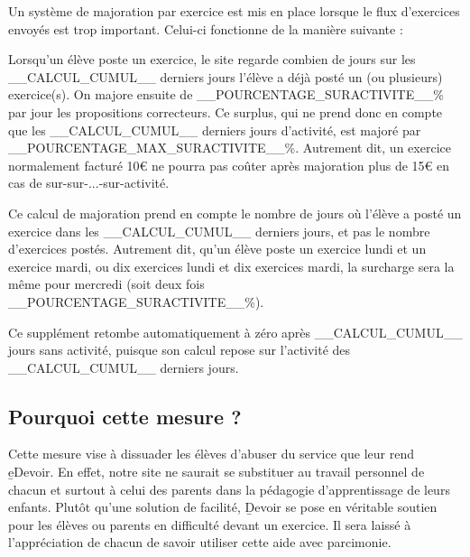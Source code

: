 ﻿Un système de majoration par exercice est mis en place lorsque le flux d'exercices envoyés est trop important. Celui-ci fonctionne de la manière suivante :
\item Lorsqu'un élève poste un exercice, le site regarde combien de jours sur les __CALCUL_CUMUL__ derniers jours l'élève a déjà posté un (ou plusieurs) exercice(s). On majore ensuite de __POURCENTAGE_SURACTIVITE__\% par jour les propositions correcteurs. Ce surplus, qui ne prend donc en compte que les __CALCUL_CUMUL__ derniers jours d'activité, est majoré par __POURCENTAGE_MAX_SURACTIVITE__\%. Autrement dit, un exercice normalement facturé 10€ ne pourra pas coûter après majoration plus de 15€ en cas de sur-sur-...-sur-activité.
\item Ce calcul de majoration prend en compte le nombre de jours où l'élève a posté un exercice dans les __CALCUL_CUMUL__ derniers jours, et pas le nombre d'exercices postés. Autrement dit, qu'un élève poste un exercice lundi et un exercice mardi, ou dix exercices lundi et dix exercices mardi, la surcharge sera la même pour mercredi (soit deux fois __POURCENTAGE_SURACTIVITE__\%).
\item Ce supplément retombe automatiquement à zéro après __CALCUL_CUMUL__ jours sans activité, puisque son calcul repose sur l'activité des __CALCUL_CUMUL__ derniers jours.

\subsection{Pourquoi cette mesure ?}

Cette mesure vise à dissuader les élèves d'abuser du service que leur rend \b{eDevoir}. En effet, notre site ne saurait se substituer au travail personnel de chacun et surtout à celui des parents dans la pédagogie d'apprentissage de leurs enfants. Plutôt qu'une solution de facilité, \b{Devoir} se pose en véritable soutien pour les élèves ou parents en difficulté devant un exercice.
Il sera laissé à l'appréciation de chacun de savoir utiliser cette aide avec parcimonie.